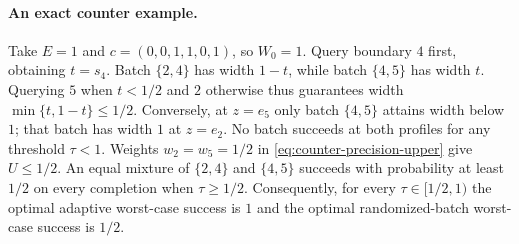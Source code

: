 \paragraph{An exact counter example.}
Take $E=1$ and $c=(0,0,1,1,0,1)$, so $W_0=1$.
Query boundary $4$ first, obtaining $t=s_4$.
Batch $\{2,4\}$ has width $1-t$, while batch $\{4,5\}$ has width $t$.
Querying $5$ when $t<1/2$ and $2$ otherwise thus guarantees
width $\min\{t,1-t\}\leq1/2$.
Conversely, at $z=e_5$ only batch $\{4,5\}$ attains width below $1$;
that batch has width $1$ at $z=e_2$. No batch succeeds at both profiles
for any threshold $\tau<1$. Weights $w_2=w_5=1/2$ in
\eqref{eq:counter-precision-upper} give $U\leq1/2$.
An equal mixture of $\{2,4\}$ and $\{4,5\}$ succeeds with probability
at least $1/2$ on every completion when $\tau\geq1/2$.
Consequently, for every $\tau\in[1/2,1)$ the optimal adaptive worst-case
success is $1$ and the optimal randomized-batch worst-case success is
$1/2$.

